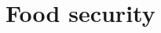 \documentclass[../summary.tex]{subfiles}
\begin{document}
	
	\section{Food security}
	
\end{document}
